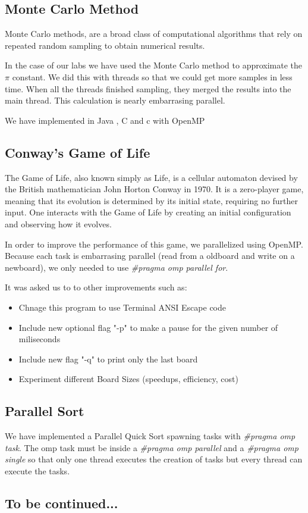 \subsection{Monte Carlo Method}

Monte Carlo methods, are a broad class of computational algorithms that rely on repeated random sampling to obtain numerical results. 

In the case of our labs we have used the Monte Carlo method to approximate the $\pi$ constant. We did this with threads so that we could get more samples in less time. When all the threads finished sampling, they merged the results into the main thread. This calculation is nearly embarrasing parallel.

We have implemented in Java , C and c with OpenMP

\subsection{Conway's Game of Life}

The Game of Life, also known simply as Life, is a cellular automaton devised by the British mathematician John Horton Conway in 1970. It is a zero-player game, meaning that its evolution is determined by its initial state, requiring no further input. One interacts with the Game of Life by creating an initial configuration and observing how it evolves.

In order to improve the performance of this game, we parallelized using OpenMP. Because each task is embarrasing parallel (read from a oldboard and write on a newboard), we only needed to use \textit{\#pragma omp parallel for}.

It was asked us to to other improvements such as:

\begin{itemize}
    \item Chnage this program to use Terminal ANSI Escape code
    \item Include new optional flag "-p" to make a pause for the given number of miliseconds
    \item Include new flag "-q" to print only the last board
    \item Experiment different Board Sizes (speedups, efficiency, cost)
\end{itemize}

\subsection{Parallel Sort}

We have implemented a Parallel Quick Sort spawning tasks with \textit{\#pragma omp task}. The omp task must be inside a \textit{\#pragma omp parallel} and a \textit{\#pragma omp single} so that only one thread executes the creation of tasks but every thread can execute the tasks.

\subsection{To be continued...}